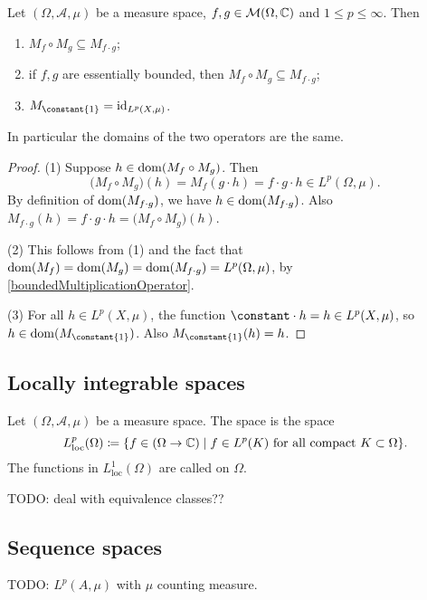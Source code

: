 \begin{lemma} \label{compositionMultiplicationOperators}
Let $(\Omega, \mathcal{A}, \mu)$ be a measure space, $f,g\in \operatorname{\mathcal{M}}(\Omega, \mathbb{C})$ and $1\leq p \leq \infty$. Then
\begin{enumerate}
\item $M_{f}\circ M_g \subseteq M_{f\cdot g}$;
\item if $f,g$ are essentially bounded, then $M_{f}\circ M_g \subseteq M_{f\cdot g}$;
\item $M_{\constant{1}} = \id_{L^p(X,\mu)}$.
\end{enumerate}
\end{lemma}
In particular the domains of the two operators are the same.
\begin{proof}
(1) Suppose $h\in \operatorname{dom}(M_{f}\circ M_g)$. Then
\[ \big(M_{f}\circ M_g\big)(h) = M_f(g\cdot h) = f\cdot g \cdot h \in L^p(\Omega,\mu). \]
By definition of $\operatorname{dom}(M_{f\cdot g})$, we have $h\in \operatorname{dom}(M_{f\cdot g})$. Also $M_{f\cdot g}(h) = f\cdot g \cdot h = \big(M_{f}\circ M_g\big)(h)$.

(2) This follows from (1) and the fact that $\operatorname{dom}(M_f) = \operatorname{dom}(M_g) = \operatorname{dom}(M_{f\cdot g}) = L^p(\Omega,\mu)$, by \ref{boundedMultiplicationOperator}.

(3) For all $h\in L^p(X,\mu)$, the function $\constant\cdot h = h \in L^p(X,\mu)$, so $h\in \dom(M_{\constant{1}})$. Also $M_{\constant{1}}(h) = h$.
\end{proof}

\subsection{Locally integrable spaces}
\begin{definition}
Let $(\Omega, \mathcal{A}, \mu)$ be a measure space. The  space is the space
\[ L^p_\text{loc}(\Omega) \defeq \setbuilder{f \in (\Omega\to\C)}{\text{$f\in L^p(K)$ for all compact $K\subset \Omega$}}. \]
The functions in $L^1_\text{loc}(\Omega)$ are called  on $\Omega$.
\end{definition}
TODO: deal with equivalence classes??


\subsection{Sequence spaces}
TODO:  $L^p(A,\mu)$ with $\mu$ counting measure.


